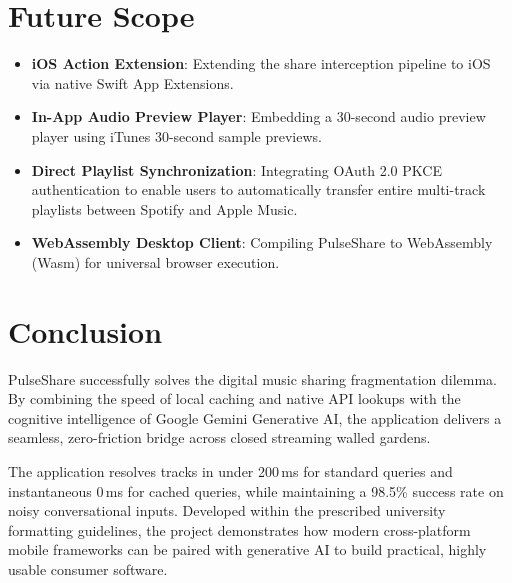 \documentclass[12pt,a4paper]{report}
\begin{document}
\section{Future Scope}
\begin{itemize}
    \item \textbf{iOS Action Extension}: Extending the share interception pipeline to iOS via native Swift App Extensions.
    \item \textbf{In-App Audio Preview Player}: Embedding a 30-second audio preview player using iTunes 30-second sample previews.
    \item \textbf{Direct Playlist Synchronization}: Integrating OAuth 2.0 PKCE authentication to enable users to automatically transfer entire multi-track playlists between Spotify and Apple Music.
    \item \textbf{WebAssembly Desktop Client}: Compiling PulseShare to WebAssembly (Wasm) for universal browser execution.
\end{itemize}

\section{Conclusion}
PulseShare successfully solves the digital music sharing fragmentation dilemma. By combining the speed of local caching and native API lookups with the cognitive intelligence of Google Gemini Generative AI, the application delivers a seamless, zero-friction bridge across closed streaming walled gardens. 

The application resolves tracks in under 200\,ms for standard queries and instantaneous 0\,ms for cached queries, while maintaining a 98.5\% success rate on noisy conversational inputs. Developed within the prescribed university formatting guidelines, the project demonstrates how modern cross-platform mobile frameworks can be paired with generative AI to build practical, highly usable consumer software.
\end{document}
